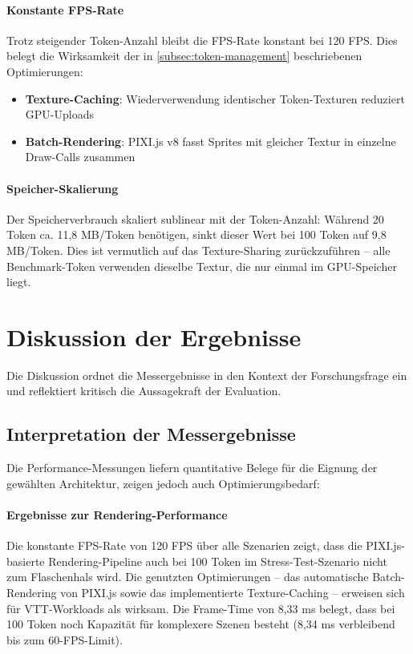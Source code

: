 \paragraph{Konstante \ac{FPS}-Rate}
Trotz steigender Token-Anzahl bleibt die \ac{FPS}-Rate konstant bei 120 \ac{FPS}. Dies belegt die Wirksamkeit der in \autoref{subsec:token-management} beschriebenen Optimierungen:
\begin{itemize}
	\item \textbf{Texture-Caching}: Wiederverwendung identischer Token-Texturen reduziert \ac{GPU}-Uploads
	\item \textbf{Batch-Rendering}: PIXI.js v8 fasst Sprites mit gleicher Textur in einzelne Draw-Calls zusammen
\end{itemize}

\paragraph{Speicher-Skalierung}
Der Speicherverbrauch skaliert sublinear mit der Token-Anzahl: Während 20 Token ca. 11,8 \ac{MB}/Token benötigen, sinkt dieser Wert bei 100 Token auf 9,8 \ac{MB}/Token. Dies ist vermutlich auf das Texture-Sharing zurückzuführen -- alle Benchmark-Token verwenden dieselbe Textur, die nur einmal im \ac{GPU}-Speicher liegt.

\section{Diskussion der Ergebnisse}
\label{sec:DiskussionErgebnisse}

Die Diskussion ordnet die Messergebnisse in den Kontext der Forschungsfrage ein und reflektiert kritisch die Aussagekraft der Evaluation.

\subsection{Interpretation der Messergebnisse}

Die Performance-Messungen liefern quantitative Belege für die Eignung der gewählten Architektur, zeigen jedoch auch Optimierungsbedarf:

\paragraph{Ergebnisse zur Rendering-Performance}
Die konstante \ac{FPS}-Rate von 120 \ac{FPS} über alle Szenarien zeigt, dass die PIXI.js-basierte Rendering-Pipeline auch bei 100 Token im Stress-Test-Szenario nicht zum Flaschenhals wird. Die genutzten Optimierungen -- das automatische Batch-Rendering von PIXI.js sowie das implementierte Texture-Caching -- erweisen sich für \ac{VTT}-Workloads als wirksam. Die Frame-Time von 8,33 \ac{ms} belegt, dass bei 100 Token noch Kapazität für komplexere Szenen besteht (8,34 \ac{ms} verbleibend bis zum 60-\ac{FPS}-Limit).

